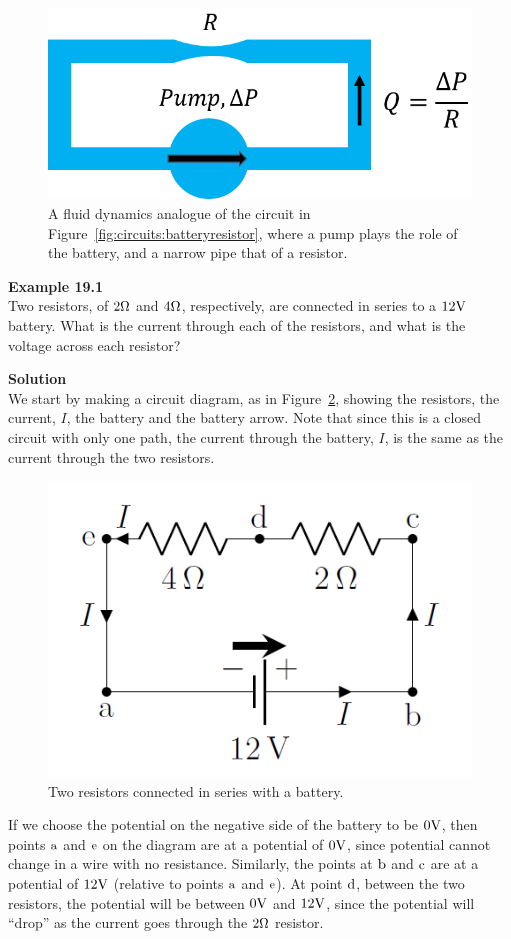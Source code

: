 \begin{figure}[!htbp]
\centering
\includegraphics[width=0.5\linewidth]{files/watercircuit-c2d85239697efc723170b761c8b1073a.png}
\caption[]{A fluid dynamics analogue of the circuit in Figure~\ref{fig:circuits:batteryresistor}, where a pump plays the role of the battery, and a narrow pipe that of a resistor.}
\label{fig:circuits:watercircuit}
\end{figure}

\begin{framed}
\textbf{Example 19.1}\\
Two resistors, of $2 {\rm \Omega}$ and $4 {\rm \Omega}$, respectively, are connected in series to a $12 {\rm V}$ battery. What is the current through each of the resistors, and what is the voltage across each resistor?

\begin{framed}
\textbf{Solution}\\
We start by making a circuit diagram, as in Figure~\ref{fig:circuits:tworesistors}, showing the resistors, the current, $I$, the battery and the battery arrow. Note that since this is a closed circuit with only one path, the current through the battery, $I$, is the same as the current through the two resistors.

\begin{figure}[!htbp]
\centering
\includegraphics[width=0.42\linewidth]{files/tworesistors-e49d8c6bd8a4e07e755b86fd2da0ea23.png}
\caption[]{Two resistors connected in series with a battery.}
\label{fig:circuits:tworesistors}
\end{figure}

If we choose the potential on the negative side of the battery to be $0 {\rm V}$, then points ${\rm a}$ and ${\rm e}$ on the diagram are at a potential of $0 {\rm V}$, since potential cannot change in a wire with no resistance. Similarly, the points at ${\rm b}$ and ${\rm c}$ are at a potential of $12 {\rm V}$ (relative to points ${\rm a}$ and ${\rm e}$). At point ${\rm d}$, between the two resistors, the potential will be between $0 {\rm V}$ and $12 {\rm V}$, since the potential will ``drop'' as the current goes through the $2 {\rm \Omega}$ resistor.


\end{framed}
\end{framed}
